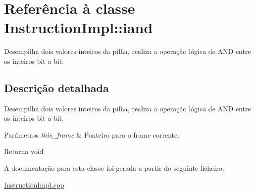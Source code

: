 \hypertarget{class_instruction_impl_1_1iand}{}\section{Referência à classe Instruction\+Impl\+:\+:iand}
\label{class_instruction_impl_1_1iand}


Desempilha dois valores inteiros da pilha, realiza a operação lógica de A\+ND entre os inteiros bit a bit.  




\subsection{Descrição detalhada}
Desempilha dois valores inteiros da pilha, realiza a operação lógica de A\+ND entre os inteiros bit a bit. 


\begin{DoxyParams}{Parâmetros}
{\em this\+\_\+frame} & Ponteiro para o frame corrente. \\
\hline
\end{DoxyParams}
\begin{DoxyReturn}{Retorna}
void 
\end{DoxyReturn}


A documentação para esta classe foi gerada a partir do seguinte ficheiro\+:\begin{DoxyCompactItemize}
\item 
\hyperlink{_instruction_impl_8cpp}{Instruction\+Impl.\+cpp}\end{DoxyCompactItemize}
